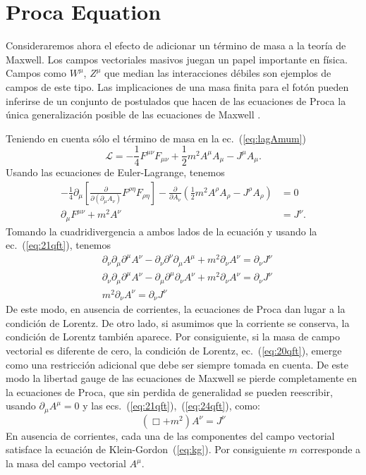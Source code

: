 \section{Proca Equation}
\label{sec:proca-equation}
Consideraremos ahora el efecto de adicionar un término de masa a la teoría de
Maxwell. Los campos vectoriales masivos juegan un papel importante en
física. Campos como $W^\mu$, $Z^\mu$ que median las interacciones débiles
son ejemplos de campos de este tipo. Las implicaciones de una masa
finita para el fotón pueden inferirse de un conjunto de postulados que
hacen de las ecuaciones de Proca la única generalización posible de
las ecuaciones de Maxwell \cite{Goldhaber:1971mr}. 

Teniendo en cuenta sólo el término de masa en la ec.~(\ref{eq:lagAmum})
\begin{equation}
  \label{eq:23qft}
  \mathcal{L}=-\frac{1}{4}F^{\mu\nu}F_{\mu\nu}+\frac{1}{2}m^2A^\mu A_\mu-J^\mu A_\mu.
\end{equation}
Usando las ecuaciones de Euler-Lagrange, tenemos
\begin{align}
-\frac{1}{4}\partial_\mu
  \left[
\frac{\partial}{\partial(\partial_\mu A_\nu)}F^{\rho\eta}F_{\rho\eta}
  \right]-
\frac{\partial}{\partial A_\nu}
\left(
\frac{1}{2}m^2A^\rho A_\rho-J^\rho A_\rho
\right)&=0\nonumber\\
\label{eq:24qft}
\partial_\mu F^{\mu\nu}+m^2A^\nu&=J^\nu.
\end{align}
Tomando la cuadridivergencia a ambos lados de la ecuación y usando la
ec.~(\ref{eq:21qft}), tenemos
\begin{align}
 &\partial_\nu\partial_\mu\partial^\mu A^\nu-\partial_\nu\partial^\nu\partial_\mu A^\mu+m^2\partial_\nu A^\nu=\partial_\nu J^\nu\nonumber\\
 &\partial_\nu\partial_\mu\partial^\mu A^\nu-\partial_\mu\partial^\mu\partial_\nu A^\nu+m^2\partial_\nu A^\nu=\partial_\nu J^\nu\nonumber\\
\label{eq:25qft}
 &m^2\partial_\nu A^\nu=\partial_\nu J^\nu
\end{align}
De este modo, en ausencia de corrientes, la ecuaciones de Proca dan
lugar a la condición de Lorentz. De otro lado, si asumimos que la
corriente se conserva, la condición de Lorentz también aparece. Por
consiguiente, si la masa de campo vectorial es diferente de cero, la
condición de Lorentz, ec.~(\ref{eq:20qft}), emerge como una restricción
adicional que debe ser siempre tomada en cuenta. De este modo la
libertad gauge de las ecuaciones de Maxwell se pierde completamente en
la ecuaciones de Proca, que sin perdida de generalidad se pueden
reescribir, usando $\partial_\mu A^\mu=0$ y las ecs.~(\ref{eq:21qft}),~(\ref{eq:24qft}),  como:
\begin{equation}
  \label{eq:26qft}
   (\Box+m^2)A^\nu=J^\nu
\end{equation}
En ausencia de corrientes, cada una de las componentes del campo
vectorial satisface la ecuación de Klein-Gordon~(\ref{eq:kg}). Por
consiguiente $m$ corresponde a la masa del campo vectorial
$A^\mu$. 

